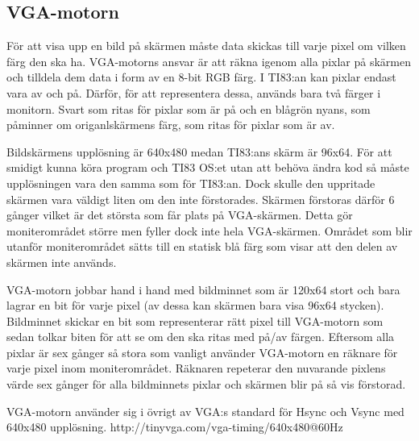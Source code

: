 \documentclass[main.tex]{subfiles}
\begin{document}
\subsection{VGA-motorn}

För att visa upp en bild på skärmen måste data skickas till varje pixel om vilken färg den ska ha. VGA-motorns ansvar är att räkna igenom alla pixlar på skärmen och tilldela dem data i form av en 8-bit RGB färg. I TI83:an kan pixlar endast vara av och på. Därför, för att representera dessa, används bara två färger i monitorn. Svart som ritas för pixlar som är på och en blågrön nyans, som påminner om origanlskärmens färg, som ritas för pixlar som är av.

Bildskärmens upplösning är 640x480 medan TI83:ans skärm är 96x64. För att smidigt kunna köra program och TI83 OS:et utan att behöva ändra kod så måste upplösningen vara den samma som för TI83:an. Dock skulle den uppritade skärmen vara väldigt liten om den inte förstorades. Skärmen förstoras därför 6 gånger vilket är det största som får plats på VGA-skärmen. Detta gör moniterområdet större men fyller dock inte hela VGA-skärmen. Området som blir utanför moniterområdet sätts till en statisk blå färg som visar att den delen av skärmen inte används. 

VGA-motorn jobbar hand i hand med bildminnet som är 120x64 stort och bara lagrar en bit för varje pixel (av dessa kan skärmen bara visa 96x64 stycken). Bildminnet skickar en bit som representerar rätt pixel till VGA-motorn som sedan tolkar biten för att se om den ska ritas med på/av färgen. Eftersom alla pixlar är sex gånger så stora som vanligt använder VGA-motorn en räknare för varje pixel inom moniterområdet. Räknaren repeterar den nuvarande pixlens värde sex gånger för alla bildminnets pixlar och skärmen blir på så vis förstorad.
 
VGA-motorn använder sig i övrigt av VGA:s standard för Hsync och Vsync med 640x480 upplösning. 
http://tinyvga.com/vga-timing/640x480@60Hz
\end{document}
